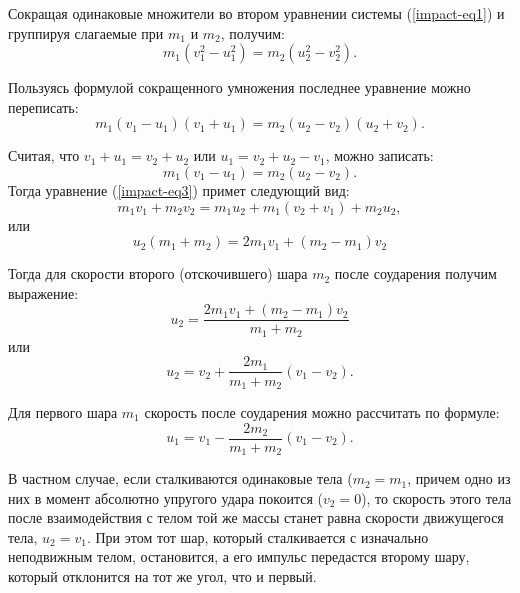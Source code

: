 \documentclass[14pt,a4paper,oneside]{extarticle}	%
\begin{document}
Сокращая одинаковые множители во втором уравнении системы (\ref{impact-eq1}) и группируя слагаемые при $ m_1 $ и $ m_2 $, получим:
\begin{equation}\label{impact-eq2}
m_{1}(v_{1}^{2} - u_{1}^{2}) = m_{2}(u_{2}^{2} - v_{2}^{2}).
\end{equation}

Пользуясь формулой сокращенного умножения последнее уравнение можно переписать:
\begin{equation}\label{impact-eq3}
m_{1}(v_{1} - u_{1})(v_{1} + u_{1}) = m_{2}(u_{2} - v_{2})(u_{2} + v_{2}).
\end{equation}

Считая, что $ v_{1} + u_{1} = v_{2} + u_{2}  $ или $ u_{1} = v_{2} + u_{2} - v_{1} $, можно записать:
\begin{equation}\label{impact-eq4}
m_{1}(v_{1} - u_{1}) = m_{2}(u_{2} - v_{2}).
\end{equation}
Тогда уравнение (\ref{impact-eq3}) примет следующий вид:
\begin{equation}\label{impact-eq5}
m_{1}v_{1} + m_{2}v_{2} = m_{1}u_{2} + m_{1} (v_{2} + v_{1}) + m_{2}u_{2},
\end{equation}
или
\begin{equation}\label{impact-eq6}
u_{2} (m_{1}+m_{2}) = 2m_{1}v_{1} + (m_{2}-m_{1})v_{2}
\end{equation}

Тогда для скорости второго (отскочившего) шара $ m_{2} $ после соударения получим выражение:
\begin{equation}\label{impact-eq7}
u_{2} = \frac{ 2m_{1}v_{1} + (m_{2}-m_{1})v_{2}}{m_{1}+m_{2}}
\end{equation}
или
\begin{equation}\label{impact-eq8}
u_{2} = v_{2} + \frac{ 2m_{1}}{m_{1}+m_{2}} (v_{1}-v_{2}).
\end{equation}

Для первого шара $ m_{1} $ скорость после соударения можно рассчитать по формуле:
\begin{equation}\label{impact-eq9}
u_{1} = v_{1} - \frac{ 2m_{2}}{m_{1}+m_{2}} (v_{1}-v_{2}).
\end{equation}

В частном случае, если сталкиваются одинаковые тела ($ m_{2}=m_{1} $, причем одно из них в момент абсолютно упругого удара покоится ($ v_{2}=0 $), то скорость этого тела после взаимодействия с телом той же массы станет равна скорости движущегося тела, $ u_{2}=v_{1} $.
При этом тот шар, который сталкивается с изначально неподвижным телом, остановится, а его импульс передастся второму шару, который отклонится на тот же угол, что и первый.
\end{document}
